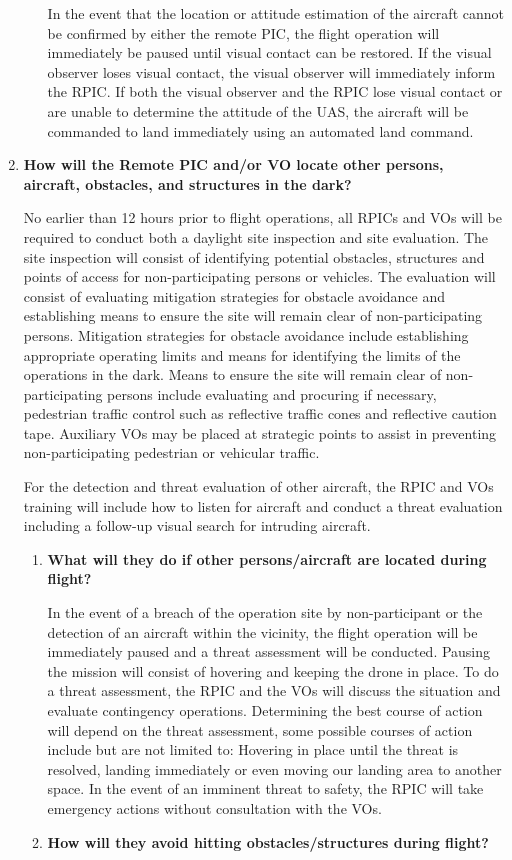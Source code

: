 \documentclass[
]{book}
\begin{document}
\begin{enumerate}
\begin{enumerate}
    In the event that the location or attitude estimation of the aircraft cannot be confirmed by either the remote PIC, the flight operation will immediately be paused until visual contact can be restored. If the visual observer loses visual contact, the visual observer will immediately inform the RPIC. If both the visual observer and the RPIC lose visual contact or are unable to determine the attitude of the UAS, the aircraft will be commanded to land immediately using an automated land command.
  \end{enumerate}
\item
  \textbf{How will the Remote PIC and/or VO locate other persons, aircraft, obstacles, and structures in the dark?}

  No earlier than 12 hours prior to flight operations, all RPICs and VOs will be required to conduct both a daylight site inspection and site evaluation. The site inspection will consist of identifying potential obstacles, structures and points of access for non-participating persons or vehicles. The evaluation will consist of evaluating mitigation strategies for obstacle avoidance and establishing means to ensure the site will remain clear of non-participating persons. Mitigation strategies for obstacle avoidance include establishing appropriate operating limits and means for identifying the limits of the operations in the dark. Means to ensure the site will remain clear of non-participating persons include evaluating and procuring if necessary, pedestrian traffic control such as reflective traffic cones and reflective caution tape. Auxiliary VOs may be placed at strategic points to assist in preventing non-participating pedestrian or vehicular traffic.

  For the detection and threat evaluation of other aircraft, the RPIC and VOs training will include how to listen for aircraft and conduct a threat evaluation including a follow-up visual search for intruding aircraft.

  \begin{enumerate}
  \def\labelenumii{\arabic{enumii}.}
  \item
    \textbf{What will they do if other persons/aircraft are located during flight?}

    In the event of a breach of the operation site by non-participant or the detection of an aircraft within the vicinity, the flight operation will be immediately paused and a threat assessment will be conducted. Pausing the mission will consist of hovering and keeping the drone in place. To do a threat assessment, the RPIC and the VOs will discuss the situation and evaluate contingency operations. Determining the best course of action will depend on the threat assessment, some possible courses of action include but are not limited to: Hovering in place until the threat is resolved, landing immediately or even moving our landing area to another space. In the event of an imminent threat to safety, the RPIC will take emergency actions without consultation with the VOs.
  \item
    \textbf{How will they avoid hitting obstacles/structures during flight?}


\end{enumerate}
\end{enumerate}
\end{document}
